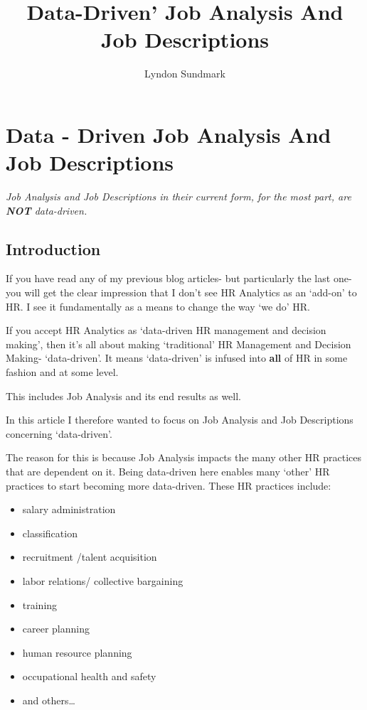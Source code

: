 \documentclass[12pt,letterpaper]{article}
\title{Data-Driven' Job Analysis And Job Descriptions}
\author{Lyndon Sundmark}
\begin{document}
\maketitle
\section{Data - Driven Job Analysis And Job Descriptions}

\emph{Job Analysis and Job Descriptions in their current form, for the
most part, are \textbf{NOT} data-driven.}

\subsection{Introduction}\label{introduction}

If you have read any of my previous blog articles- but particularly the
last one- you will get the clear impression that I don't see HR
Analytics as an `add-on' to HR. I see it fundamentally as a means to
change the way `we do' HR.

If you accept HR Analytics as `data-driven HR management and decision
making', then it's all about making `traditional' HR Management and
Decision Making- `data-driven'. It means `data-driven' is infused into
\textbf{all} of HR in some fashion and at some level.

This includes Job Analysis and its end results as well.

In this article I therefore wanted to focus on Job Analysis and Job
Descriptions concerning `data-driven'.

The reason for this is because Job Analysis impacts the many other HR
practices that are dependent on it. Being data-driven here enables many
`other' HR practices to start becoming more data-driven.
These HR practices include:

\begin{itemize}
\item
  salary administration
\item
  classification
\item
  recruitment /talent acquisition
\item
  labor relations/ collective bargaining
\item
  training
\item
  career planning
\item
  human resource planning
\item
  occupational health and safety
\item
  and others\ldots{}
\end{itemize}
\end{document}
